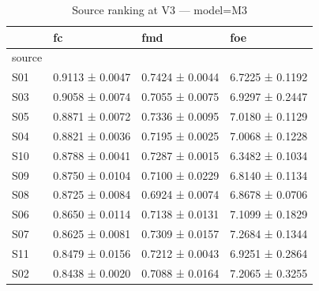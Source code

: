 \begin{table}[htbp]
\centering
\caption{Source ranking at V3 — model=M3}
\label{tab:rank:M3}
\begin{tabular}{llll}
\toprule
\toprule
 & fc & fmd & foe \\
\midrule
source &  &  &  \\
\midrule
S01 & 0.9113 ± 0.0047 & 0.7424 ± 0.0044 & 6.7225 ± 0.1192 \\
S03 & 0.9058 ± 0.0074 & 0.7055 ± 0.0075 & 6.9297 ± 0.2447 \\
S05 & 0.8871 ± 0.0072 & 0.7336 ± 0.0095 & 7.0180 ± 0.1129 \\
S04 & 0.8821 ± 0.0036 & 0.7195 ± 0.0025 & 7.0068 ± 0.1228 \\
S10 & 0.8788 ± 0.0041 & 0.7287 ± 0.0015 & 6.3482 ± 0.1034 \\
S09 & 0.8750 ± 0.0104 & 0.7100 ± 0.0229 & 6.8140 ± 0.1134 \\
S08 & 0.8725 ± 0.0084 & 0.6924 ± 0.0074 & 6.8678 ± 0.0706 \\
S06 & 0.8650 ± 0.0114 & 0.7138 ± 0.0131 & 7.1099 ± 0.1829 \\
S07 & 0.8625 ± 0.0081 & 0.7309 ± 0.0157 & 7.2684 ± 0.1344 \\
S11 & 0.8479 ± 0.0156 & 0.7212 ± 0.0043 & 6.9251 ± 0.2864 \\
S02 & 0.8438 ± 0.0020 & 0.7088 ± 0.0164 & 7.2065 ± 0.3255 \\
\bottomrule
\end{tabular}\end{table}
